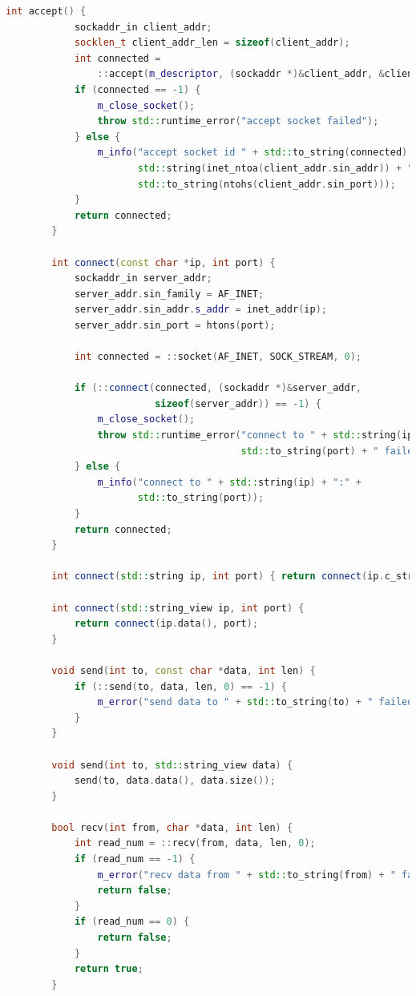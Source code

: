 \documentclass{article}
\begin{document}
\begin{lstlisting}[language=C++]
        int accept() {
            sockaddr_in client_addr;
            socklen_t client_addr_len = sizeof(client_addr);
            int connected =
                ::accept(m_descriptor, (sockaddr *)&client_addr, &client_addr_len);
            if (connected == -1) {
                m_close_socket();
                throw std::runtime_error("accept socket failed");
            } else {
                m_info("accept socket id " + std::to_string(connected) + " from " +
                       std::string(inet_ntoa(client_addr.sin_addr)) + ":" +
                       std::to_string(ntohs(client_addr.sin_port)));
            }
            return connected;
        }
    
        int connect(const char *ip, int port) {
            sockaddr_in server_addr;
            server_addr.sin_family = AF_INET;
            server_addr.sin_addr.s_addr = inet_addr(ip);
            server_addr.sin_port = htons(port);
    
            int connected = ::socket(AF_INET, SOCK_STREAM, 0);
    
            if (::connect(connected, (sockaddr *)&server_addr,
                          sizeof(server_addr)) == -1) {
                m_close_socket();
                throw std::runtime_error("connect to " + std::string(ip) + ":" +
                                         std::to_string(port) + " failed");
            } else {
                m_info("connect to " + std::string(ip) + ":" +
                       std::to_string(port));
            }
            return connected;
        }
    
        int connect(std::string ip, int port) { return connect(ip.c_str(), port); }
    
        int connect(std::string_view ip, int port) {
            return connect(ip.data(), port);
        }
    
        void send(int to, const char *data, int len) {
            if (::send(to, data, len, 0) == -1) {
                m_error("send data to " + std::to_string(to) + " failed");
            }
        }
    
        void send(int to, std::string_view data) {
            send(to, data.data(), data.size());
        }
    
        bool recv(int from, char *data, int len) {
            int read_num = ::recv(from, data, len, 0);
            if (read_num == -1) {
                m_error("recv data from " + std::to_string(from) + " failed");
                return false;
            }
            if (read_num == 0) {
                return false;
            }
            return true;
        }
    

\end{lstlisting}
\end{document}

